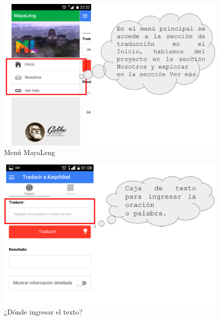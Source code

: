 \documentclass[landscape,12pt]{article}
\begin{document}

\newpage
\pagestyle{fancy}
\begin{figure}[htb]
	\centering
	\includegraphics[width=17cm]{ml_1}	
	\caption{Menú MayaLeng}
	\label{fig:ml1}
\end{figure}
\newpage

\begin{figure}[htb]
	  \centering
	\includegraphics[width=17cm]{ml_2}
	\caption{¿Dónde ingresar el texto?}
	\label{fig:ml2}
\end{figure}
\newpage
\end{document}
